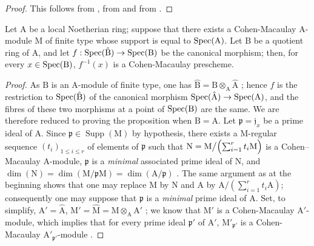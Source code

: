 \begin{proof}
This follows from , from  and from .
\end{proof}

\begin{proposition}[6.3.8]
\label{IV.6.3.8}
Let $\mathrm{A}$ be a local Noetherian ring; suppose that there exists a Cohen-Macaulay $\mathrm{A}$-module $\mathrm{M}$ of finite type whose support is equal to $\operatorname{Spec}(\mathrm{A})$.
Let $\mathrm{B}$ be a quotient ring of $\mathrm{A}$, and let $f:\operatorname{Spec}(\hat{\mathrm{B}})\to\operatorname{Spec}(\mathrm{B})$ be the canonical morphism; then, for every $x\in\operatorname{Spec}(\mathrm{B})$, $f^{-1}(x)$ is a Cohen-Macaulay prescheme.
\end{proposition}

\begin{proof}
As $\mathrm{B}$ is an $\mathrm{A}$-module of finite type, one has $\hat{\mathrm{B}}=\mathrm{B}\otimes_\mathrm{A}\hat{\mathrm{A}}$ ; hence $f$ is the restriction to $\operatorname{Spec}(\hat{\mathrm{B}})$ of the canonical morphism $\operatorname{Spec}(\hat{\mathrm{A}})\to\operatorname{Spec}(\mathrm{A})$, and the fibres of these two morphisms at a point of $\operatorname{Spec}(\mathrm{B})$ are the same.
We are therefore reduced to proving the proposition when $\mathrm{B}=\mathrm{A}$.
Let $\mathfrak{p}=\mathfrak{j}_x$ be a prime ideal of $\mathrm{A}$. Since $\mathfrak{p}\in\operatorname{Supp}(\mathrm{M})$ by hypothesis, there exists  a $\mathrm{M}$-regular sequence $(t_i)_{1\leqslant i\leqslant r}$ of elements of $\mathfrak{p}$ such that $\mathrm{N}=\mathrm{M}\big/\Bigl(\sum_{i=1}^r t_i\mathrm{M}\Bigr)$
is a Cohen--Macaulay $\mathrm{A}$-module, $\mathfrak{p}$ is a \emph{minimal} associated prime ideal of $\mathrm{N}$, and $\dim(\mathrm{N})=\dim(\mathrm{M}/\mathfrak{p}\mathrm{M})=\dim(\mathrm{A}/\mathfrak{p})$
. The same argument as at the beginning shows that one may replace $\mathrm{M}$ by $\mathrm{N}$ and $\mathrm{A}$ by $\mathrm{A}/(\sum_{i=1}^r t_i\mathrm{A})$; consequently one may suppose that $\mathfrak{p}$ is a \emph{minimal} prime ideal of $\mathrm{A}$.
Set, to simplify, $\mathrm{A}'=\hat{\mathrm{A}}$, $\mathrm{M}'=\hat{\mathrm{M}}=\mathrm{M}\otimes_\mathrm{A}\mathrm{A}'$ ; we know  that $\mathrm{M}'$ is a Cohen-Macaulay $\mathrm{A}'$-module, which implies that for every prime ideal $\mathfrak{p}'$ of $\mathrm{A}'$, $\mathrm{M}'_{\mathfrak{p}'}$ is a Cohen-Macaulay $\mathrm{A}'_{\mathfrak{p}'}$-module .

\end{proof}
